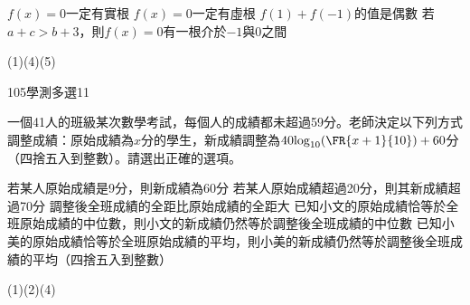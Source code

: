 \begin{QUESTIONS}
\begin{QUESTION}
\begin{QBODY}
\begin{QOPS}
				\QOP $f(x)=0$一定有實根
				\QOP $f(x)=0$一定有虛根
				\QOP $f(1)+f(-1)$的值是偶數
				\QOP 若$a+c>b+3$，則$f(x)=0$有一根介於$-1$與0之間
			\end{QOPS}
        \end{QBODY}
        \begin{QFROMS}
        \end{QFROMS}
        \begin{QTAGS}\end{QTAGS}
        \begin{QANS}
            (1)(4)(5)
        \end{QANS}
        \begin{QSOLLIST}
        \end{QSOLLIST}
        \begin{QEMPTYSPACE}
        \end{QEMPTYSPACE}
    \end{QUESTION}
    \begin{QUESTION}
        \begin{ExamInfo}{105}{學測}{多選}{11}
        \end{ExamInfo}
        \begin{ExamAnsRateInfo}{47}{67}{49}{25}
        \end{ExamAnsRateInfo}
        \begin{QBODY}
            一個41人的班級某次數學考試，每個人的成績都未超過59分。老師決定以下列方式調整成績：原始成績為$x$分的學生，新成績調整為$40{{\log }_{10}}(\FR{x+1}{10})+60$分（四捨五入到整數）。請選出正確的選項。
			\begin{QOPS}
				\QOP 若某人原始成績是9分，則新成績為60分
				\QOP 若某人原始成績超過20分，則其新成績超過70分
				\QOP 調整後全班成績的全距比原始成績的全距大
				\QOP 已知小文的原始成績恰等於全班原始成績的中位數，則小文的新成績仍然等於調整後全班成績的中位數
				\QOP 已知小美的原始成績恰等於全班原始成績的平均，則小美的新成績仍然等於調整後全班成績的平均（四捨五入到整數）
			\end{QOPS}
        \end{QBODY}
        \begin{QFROMS}
        \end{QFROMS}
        \begin{QTAGS}\end{QTAGS}
        \begin{QANS}
            (1)(2)(4)
        \end{QANS}
        \begin{QSOLLIST}

\end{QSOLLIST}
\end{QUESTION}
\end{QUESTIONS}
